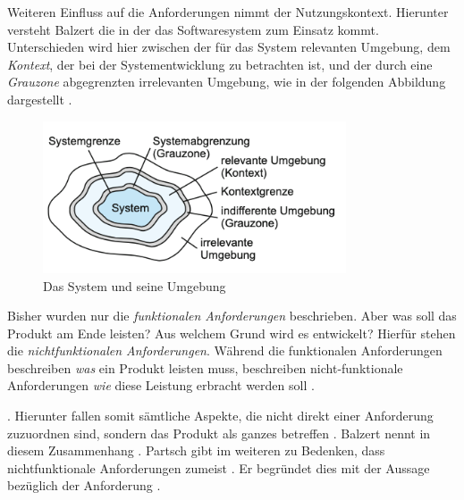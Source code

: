Weiteren Einfluss auf die Anforderungen nimmt der Nutzungskontext. Hierunter versteht Balzert die  \citep[][461]{Balzert2010} in der das Softwaresystem zum Einsatz kommt. 
Unterschieden wird hier zwischen der für das System relevanten Umgebung, dem \textit{Kontext}, der bei der Systementwicklung zu betrachten ist, und der durch eine \textit{Grauzone} abgegrenzten irrelevanten Umgebung, wie in der folgenden Abbildung dargestellt \citep[vgl.][462]{Balzert2010}.

\begin{figure}[h]
  \centering
  \includegraphics[width=0.8\textwidth]{res/Anforderung1.png}
  \caption{Das System und seine Umgebung \citep[][462]{Balzert2010}}
  \label{fig:Systemumgebung}
\end{figure}

Bisher wurden nur die \textit{funktionalen Anforderungen} beschrieben. Aber was soll das Produkt am Ende leisten? Aus welchem Grund wird es entwickelt? Hierfür stehen die \textit{nichtfunktionalen Anforderungen}. 
Während die funktionalen Anforderungen beschreiben \textit{was} ein Produkt leisten muss, beschreiben nicht-funktionale Anforderungen \textit{wie} diese Leistung erbracht werden soll \citep[vgl.][30]{Partsch2010}.

 \citep[][S. 27 f.]{Partsch2010}.
Hierunter fallen somit sämtliche Aspekte, die nicht direkt einer Anforderung zuzuordnen sind, sondern das Produkt als ganzes betreffen \citep[vgl.][463]{Balzert2010}. Balzert nennt in diesem Zusammenhang  \citep[][463]{Balzert2010}. 
Partsch gibt im weiteren zu Bedenken, dass nichtfunktionale Anforderungen zumeist  \citep[][30]{Partsch2010}. Er begründet dies mit der Aussage bezüglich der Anforderung  \citep[][30]{Partsch2010}.




